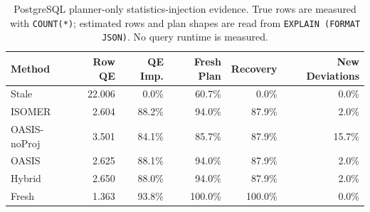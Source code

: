 \begin{table}[t]
  \centering
  \small
  \caption{PostgreSQL planner-only statistics-injection evidence. True rows are measured with \texttt{COUNT(*)}; estimated rows and plan shapes are read from \texttt{EXPLAIN (FORMAT JSON)}. No query runtime is measured.}
  \label{tab:postgres_planner_stats_injection}
  \setlength{\tabcolsep}{4pt}
  \begin{tabular}{lrrrrr}
    \toprule
    Method & Row QE & QE Imp. & Fresh Plan & Recovery & New Deviations \\
    \midrule
    Stale & 22.006 & 0.0\% & 60.7\% & 0.0\% & 0.0\% \\
    ISOMER & 2.604 & 88.2\% & 94.0\% & 87.9\% & 2.0\% \\
    OASIS-noProj & 3.501 & 84.1\% & 85.7\% & 87.9\% & 15.7\% \\
    OASIS & 2.625 & 88.1\% & 94.0\% & 87.9\% & 2.0\% \\
    Hybrid & 2.650 & 88.0\% & 94.0\% & 87.9\% & 2.0\% \\
    Fresh & 1.363 & 93.8\% & 100.0\% & 100.0\% & 0.0\% \\
    \bottomrule
  \end{tabular}
\end{table}
